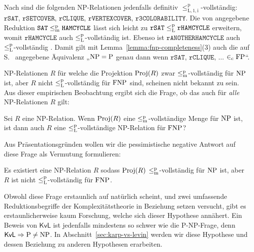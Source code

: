 Nach \textcite[104]{goldreich_computational_2008} sind die folgenden NP-Relationen jedenfalls definitiv $\leq_\mathrm{L,1,i}^\mathrm p$-vollständig: $\mathtt{rSAT}$, $\mathtt{rSETCOVER}$, $\mathtt{rCLIQUE}$, $\mathtt{rVERTEXCOVER}$, $\mathtt{r3COLORABILITY}$.
Die von \textcite[193-198]{papadimitriou_computational_1994} angegebene Reduktion $\mathtt{SAT}\leq_\mathrm{m}^\mathrm{p}\mathtt{HAMCYCLE}$ lässt sich leicht zu $\mathtt{rSAT}\leq_\mathrm{L}^\mathrm{p}\mathtt{rHAMCYCLE}$ erweitern, womit $\mathtt{rHAMCYCLE}$ auch $\leq_\mathrm{L}^\mathrm{p}$-vollständig ist.
Ebenso ist $\mathtt{rANOTHERHAMCYCLE}$ auch $\leq_\mathrm{L}^\mathrm{p}$-vollständig \parencite*[232]{papadimitriou_computational_1994}. Damit gilt mit Lemma~\ref{lemma:fnp-completeness}(3) auch die auf S.~\pageref{page:natural-searchproblems} angegebene Äquivalenz „$\mathrm{NP}=\mathrm{P}$ genau dann wenn $\mathtt{rSAT}$, $\mathtt{rCLIQUE}$, $\dots$ $\in_\mathrm{c} \mathrm{FP}$“.

NP-Relationen $R$ für welche die Projektion $\operatorname{Proj}(R)$ zwar $\leq_\mathrm{m}^\mathrm{p}$-vollständig für $\mathrm{NP}$ ist, aber $R$ nicht $\leq_\mathrm{L}^\mathrm{p}$-vollständig für $\mathrm{FNP}$ sind, scheinen nicht bekannt zu sein.
Aus dieser empirischen Beobachtung ergibt sich die Frage, ob das auch für \emph{alle} NP-Relationen $R$ gilt: 
\begin{question}\label{question:kvl}
Sei $R$ eine NP-Relation. Wenn $\operatorname{Proj}(R)$ eine $\leq_\mathrm{m}^\mathrm{p}$-vollständige Menge für $\mathrm{NP}$ ist, ist dann auch $R$ eine $\leq_\mathrm{L}^\mathrm{p}$-vollständige NP-Relation für $\mathrm{FNP}$?
\end{question}
Aus Präsentationsgründen wollen wir die pessimistische negative Antwort auf diese Frage als Vermutung formulieren:
\begin{conjecture}\label{conj:kvl}
    Es existiert eine NP-Relation $R$ sodass $\operatorname{Proj}(R)$ $\leq_\mathrm{m}^\mathrm{p}$-vollständig für $\mathrm{NP}$ ist, aber $R$ ist nicht $\leq_\mathrm{L}^\mathrm{p}$-vollständig für $\mathrm{FNP}$.
\end{conjecture}
Obwohl diese Frage erstaunlich auf natürlich scheint, und zwei umfassende Reduktionsbegriffe der Komplexitätstheorie in Beziehung setzen versucht, gibt es erstaunlicherweise kaum Forschung, welche sich dieser Hypothese annähert.
Ein Beweis von $\mathsf{KvL}$ ist jedenfalls mindestens so schwer wie die P-NP-Frage, denn $\mathsf{KvL}\Rightarrow \mathrm{P}\neq \mathrm{NP}$.
In Abschnitt~\ref{sec:karp-vs-levin} werden wir diese Hypothese und dessen Beziehung zu anderen Hypothesen erarbeiten. %

